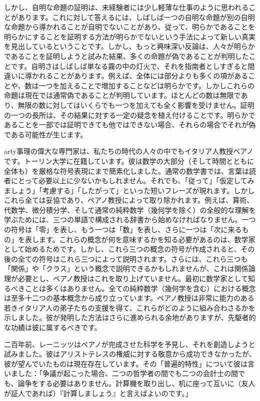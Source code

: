\documentclass[a4paper,11pt,openany]{ltjsbook}
\begin{document}
しかし、自明な命題の証明は、未経験者には少し軽薄な仕事のように思われることがあります。これに対して答えるには、しばしば一つの自明な命題が別の自明な命題から導かれることが自明でないことがあり、従って、明らかであることを明らかにすることを証明する方法が明らかでないという手法によって新しい真実を見出しているということです。しかし、もっと興味深い反論は、人々が明らかであることを証明しようと試みた結果、多くの命題が偽であることが判明したことです。自明さはしばしば単なる霧の中の灯火で、それを指南者としすぎると間違いに導かれることがあります。例えば、全体には部分よりも多くの項があることや、数は一つを加えることで増加することなどは明らかです。しかしこれらの命題は現在では通常偽であることが判明しています。ほとんどの数は無限であり、無限の数に対してはいくらでも一つを加えても全く影響を受けません。証明の一つの長所は、その結果に対する一定の疑念を植え付けることです。明らかであることを一部では証明できても他ではできない場合、それらの場合でそれが偽である可能性が生じます。

arty事理の偉大な専門家は、私たちの時代の人々の中でもイタリア人教授ペアノです。トーリン大学に在籍しています。彼は数学の大部分（そして時間とともに全体も）を厳格な符号表現にまで簡素化しました。通常の数学書では、言葉は読者にとって必要以上に少ないかもしれません。それでも、「従って」「仮定してみましょう」「考慮する」「したがって」といった短いフレーズが現れます。しかしこれら全ては妥協であり、ペアノ教授によって取り除かれます。例えば、算術、代数学、微分積分学、そして通常の純粋数学（幾何学を除く）の全般的な理解を学ぶためには、三つの単語で構成される辞書から始めなければなりません。一つの符号は「零」を表し、もう一つは「数」を表し、さらに一つは「次に来るもの」を表します。これらの概念が何を意味するかを知る必要があるのは、数学家として始めるためです。しかし、これら三つの概念の符号が作成されると、その後の全ての符号はこれら三つによって説明されます。さらには、これら三つも「関係」や「クラス」という概念で説明できるかもしれませんが、これは関係論理が必要とし、ペアノ教授はこれを取り上げていません。最初に数学家として知るべきことは多くはありません。全ての純粋数学（幾何学を含む）における概念は至多十二つの基本概念から成り立っています。ペアノ教授は非常に能力のある若きイタリア人の弟子たちの支援を得て、これらがどのように組み合わさるかを示しました。彼が発明した方法はさらに進められる余地がありますが、先駆者的な功績は彼に属するべきです。

二百年前、レーニッツはペアノが完成させた科学を予見し、それを創造しようと試みました。彼はアリストテレスの権威に対する敬意から成功できなかったが、彼が望んでいたものは現在存在しています。その「普遍的特性」について彼は言いました：「争議が起こった場合、二つの哲学者の間でも二つの会計士の間でも、論争をする必要はありません。計算機を取り出し、机に座って互いに（友人が証人であれば）『計算しましょう』と言えばよいのです。」
\end{document}

